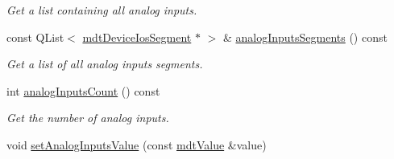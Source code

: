 \begin{DoxyCompactItemize}
\begin{DoxyCompactList}\small\item\em Get a list containing all analog inputs. \end{DoxyCompactList}\item 
\hypertarget{classmdt_device_ios_a71a1b9cdbc524e4d0094ab37575defc1}{
const QList$<$ \hyperlink{classmdt_device_ios_segment}{mdtDeviceIosSegment} $\ast$ $>$ \& \hyperlink{classmdt_device_ios_a71a1b9cdbc524e4d0094ab37575defc1}{analogInputsSegments} () const }
\label{classmdt_device_ios_a71a1b9cdbc524e4d0094ab37575defc1}

\begin{DoxyCompactList}\small\item\em Get a list of all analog inputs segments. \end{DoxyCompactList}\item 
\hypertarget{classmdt_device_ios_a904069e2e641c92291226ea2524eadb3}{
int \hyperlink{classmdt_device_ios_a904069e2e641c92291226ea2524eadb3}{analogInputsCount} () const }
\label{classmdt_device_ios_a904069e2e641c92291226ea2524eadb3}

\begin{DoxyCompactList}\small\item\em Get the number of analog inputs. \end{DoxyCompactList}\item 
\hypertarget{classmdt_device_ios_aeaa1a401ec975a67f87c62d4abae65ee}{
void \hyperlink{classmdt_device_ios_aeaa1a401ec975a67f87c62d4abae65ee}{setAnalogInputsValue} (const \hyperlink{classmdt_value}{mdtValue} \&value)}
\label{classmdt_device_ios_aeaa1a401ec975a67f87c62d4abae65ee}


\end{DoxyCompactItemize}
